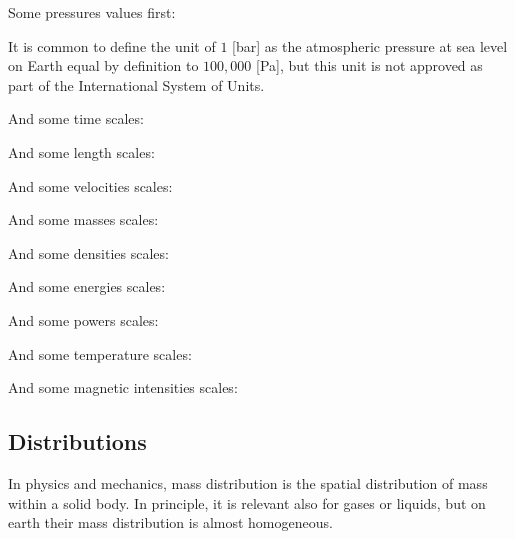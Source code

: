 	Some pressures values first:
		
	\begin{tcolorbox}[title=Remark,colframe=black,arc=10pt]
	It is common to define the unit of $1$ [bar] as the atmospheric pressure at sea level on Earth equal by definition to $100,000$ [Pa], but this unit is not approved as part of the International System of Units.
	\end{tcolorbox}
	
	
	And some time scales:
	
	
	And some length scales:
	
	
	And some velocities scales:
	
	
	And some masses scales:
	
	And some densities scales:
	
	
	And some energies scales:
	
	
	And some powers scales:
	

	And some temperature scales:
	
	
	And some magnetic intensities scales:
	
	

	
	\pagebreak
	\subsection{Distributions}
	In physics and mechanics, mass distribution is the spatial distribution of mass within a solid body. In principle, it is relevant also for gases or liquids, but on earth their mass distribution is almost homogeneous.
	
